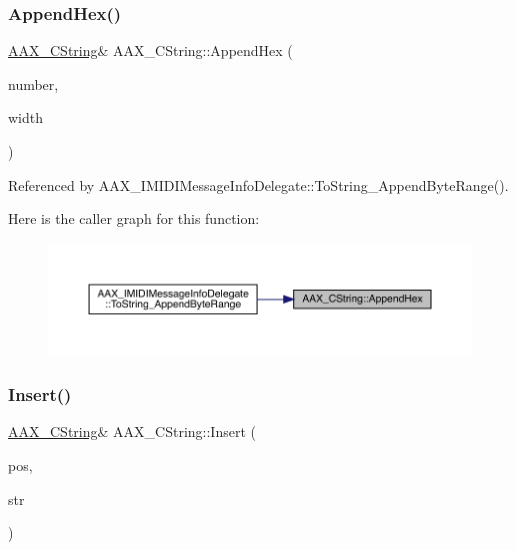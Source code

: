 \mbox{\label{a01573_a245305cf7cea6f5ba710bdbf7803b535}} 
\subsubsection{\texorpdfstring{AppendHex()}{AppendHex()}}
{\footnotesize\ttfamily \mbox{\hyperlink{a01573}{A\+A\+X\+\_\+\+C\+String}}\& A\+A\+X\+\_\+\+C\+String\+::\+Append\+Hex (\begin{DoxyParamCaption}\item[{int32\+\_\+t}]{number,  }\item[{int32\+\_\+t}]{width }\end{DoxyParamCaption})}



Referenced by A\+A\+X\+\_\+\+I\+M\+I\+D\+I\+Message\+Info\+Delegate\+::\+To\+String\+\_\+\+Append\+Byte\+Range().

Here is the caller graph for this function\+:
\nopagebreak
\begin{figure}[H]
\begin{center}
\leavevmode
\includegraphics[width=350pt]{a01573_a245305cf7cea6f5ba710bdbf7803b535_icgraph}
\end{center}
\end{figure}
\mbox{\label{a01573_ac75c6fa9a9feca688723726752e276ef}} 
\subsubsection{\texorpdfstring{Insert()}{Insert()}\hspace{0.1cm}{\footnotesize\ttfamily [1/2]}}
{\footnotesize\ttfamily \mbox{\hyperlink{a01573}{A\+A\+X\+\_\+\+C\+String}}\& A\+A\+X\+\_\+\+C\+String\+::\+Insert (\begin{DoxyParamCaption}\item[{uint32\+\_\+t}]{pos,  }\item[{const \mbox{\hyperlink{a01573}{A\+A\+X\+\_\+\+C\+String}} \&}]{str }\end{DoxyParamCaption})}

